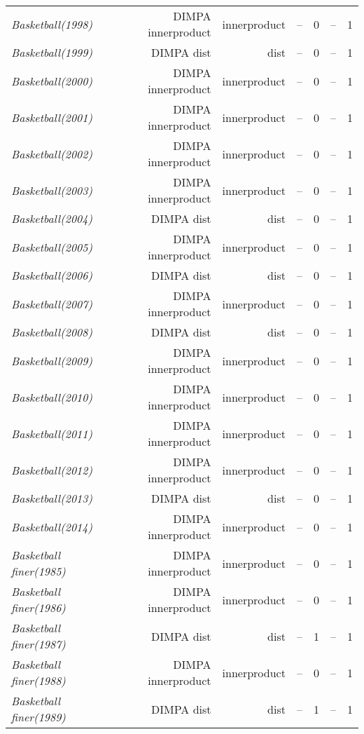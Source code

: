 \documentclass[nohyperref]{article}
\theoremstyle{plain}
\theoremstyle{definition}
\theoremstyle{remark}
\begin{document}
\begin{table*}[!ht]
{\begin{tabular}{lrrrrrr}
			{\it Basketball(1998)} & DIMPA innerproduct & innerproduct & -- & 0 & -- & 1 \\
			{\it Basketball(1999)} & DIMPA dist & dist & -- & 0 & -- & 1 \\
			{\it Basketball(2000)} & DIMPA innerproduct & innerproduct & -- & 0 & -- & 1 \\
			{\it Basketball(2001)} & DIMPA innerproduct & innerproduct & -- & 0 & -- & 1 \\
			{\it Basketball(2002)} & DIMPA innerproduct & innerproduct & -- & 0 & -- & 1 \\
			{\it Basketball(2003)} & DIMPA innerproduct & innerproduct & -- & 0 & -- & 1 \\
			{\it Basketball(2004)} & DIMPA dist & dist & -- & 0 & -- & 1 \\
			{\it Basketball(2005)} & DIMPA innerproduct & innerproduct & -- & 0 & -- & 1 \\
			{\it Basketball(2006)} & DIMPA dist & dist & -- & 0 & -- & 1 \\
			{\it Basketball(2007)} & DIMPA innerproduct & innerproduct & -- & 0 & -- & 1 \\
			{\it Basketball(2008)} & DIMPA dist & dist & -- & 0 & -- & 1 \\
			{\it Basketball(2009)} & DIMPA innerproduct & innerproduct & -- & 0 & -- & 1 \\
			{\it Basketball(2010)} & DIMPA innerproduct & innerproduct & -- & 0 & -- & 1 \\
			{\it Basketball(2011)} & DIMPA innerproduct & innerproduct & -- & 0 & -- & 1 \\
			{\it Basketball(2012)} & DIMPA innerproduct & innerproduct & -- & 0 & -- & 1 \\
			{\it Basketball(2013)} & DIMPA dist & dist & -- & 0 & -- & 1 \\
			{\it Basketball(2014)} & DIMPA innerproduct & innerproduct & -- & 0 & -- & 1 \\
			{\it Basketball finer(1985)} & DIMPA innerproduct & innerproduct & -- & 0 & -- & 1 \\
			{\it Basketball finer(1986)} & DIMPA innerproduct & innerproduct & -- & 0 & -- & 1 \\
			{\it Basketball finer(1987)} & DIMPA dist & dist & -- & 1 & -- & 1 \\
			{\it Basketball finer(1988)} & DIMPA innerproduct & innerproduct & -- & 0 & -- & 1 \\
			{\it Basketball finer(1989)} & DIMPA dist & dist & -- & 1 & -- & 1 \\

\end{tabular}}
\end{table*}
\end{document}
